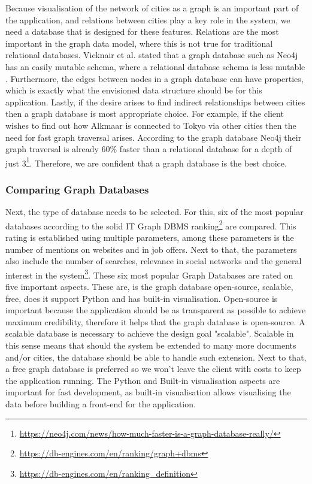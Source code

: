 Because visualisation of the network of cities as a graph is an important part of the application, and relations between cities play a key role in the system, we need a database that is designed for these features. Relations are the most important in the graph data model, where this is not true for traditional relational databases. Vicknair et al. stated that a graph database such as Neo4j has an easily mutable schema, where a relational database schema is less mutable \cite{vicknair2010}. Furthermore, the edges between nodes in a graph database can have properties, which is exactly what the envisioned data structure should be for this application. Lastly, if the desire arises to find indirect relationships between cities then a graph database is most appropriate choice. For example, if the client wishes to find out how Alkmaar is connected to Tokyo via other cities then the need for fast graph traversal arises. According to the graph database Neo4j their graph traversal is already 60\% faster than a relational database for a depth of just 3\footnote{\url{https://neo4j.com/news/how-much-faster-is-a-graph-database-really/}}.  Therefore, we are confident that a graph database is the best choice.

\subsubsection{Comparing Graph Databases}
Next, the type of database needs to be selected. For this, six of the most popular databases according to the solid IT Graph DBMS ranking\footnote{\url{https://db-engines.com/en/ranking/graph+dbms}\label{ranking}} are compared. This rating is established using multiple parameters, among these parameters is the number of mentions on websites and in job offers. Next to that, the parameters also include the number of searches, relevance in social networks and the general interest in the system\footnote{\url{https://db-engines.com/en/ranking_definition}}. These six most popular Graph Databases are rated on five important aspects. These are, is the graph database open-source, scalable, free, does it support Python and has built-in visualisation. Open-source is important because the application should be as transparent as possible to achieve maximum credibility, therefore it helps that the graph database is open-source. A scalable database is necessary to achieve the design goal "scalable". Scalable in this sense means that should the system be extended to many more documents and/or cities, the database should be able to handle such extension. Next to that, a free graph database is preferred so we won't leave the client with costs to keep the application running. The Python and Built-in visualisation aspects are important for fast development, as built-in visualisation allows visualising the data before building a front-end for the application.



